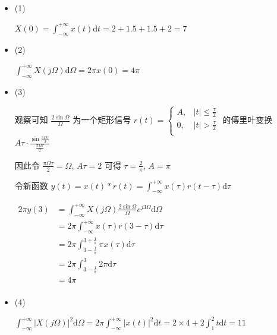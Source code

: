 \documentclass[a4paper,UTF8]{article}
\numberwithin{equation}{section}
\begin{document}
\begin{framed}
\begin{spacing}{1.5}
    \begin{itemize}
      \item (1)

      $\displaystyle X(0) = \int_{-\infty}^{+\infty}x(t)\mathrm{d}t = 2 + 1.5 + 1.5 + 2 = 7$
      
      \item (2)
      
      $\displaystyle \int_{-\infty}^{+\infty}X(j\Omega)\mathrm{d}\Omega = 2\pi x(0) = 4\pi$
      
      \item (3)
      
      观察可知 $\displaystyle \frac{2\sin \Omega}{\Omega}$ 为一个矩形信号 $r(t) = \begin{cases}
          A, & |t| \le \frac{\tau}{2} \\
          0, & |t| > \frac{\tau}{2} \\
      \end{cases}$ 的傅里叶变换 $\displaystyle A\tau \cdot \frac{\sin \frac{\pi \Omega \tau}{2}}{\frac{\pi \Omega \tau}{2}}$
      
      因此令 $\displaystyle \frac{\pi \Omega\tau}{2} = \Omega$, $A\tau = 2$ 可得 $\displaystyle \tau = \frac{2}{\pi}$, $A = \pi$
      
      令新函数 $\displaystyle y(t) = x(t) * r(t) = \int_{-\infty}^{+\infty}x(\tau)r(t-\tau)\mathrm{d}\tau$
      
      $
      \begin{aligned}
      \displaystyle 2\pi y(3) & = \int_{-\infty}^{+\infty}X(j\Omega)\frac{2\sin \Omega}{\Omega}e^{j 3\Omega}\mathrm{d}\Omega  \\
      & = 2\pi \int_{-\infty}^{+\infty}x(\tau)r(3-\tau)\mathrm{d}\tau  \\
      & = 2\pi \int_{3-\frac{1}{\pi}}^{3+\frac{1}{\pi}}\pi x(\tau)\mathrm{d}\tau  \\
      & = 2\pi \int_{3-\frac{1}{\pi}}^{3}2\pi\mathrm{d}\tau  \\
      & = 4 \pi  \\
      \end{aligned}
      $
      
      \item (4)
      
      $\displaystyle \int_{-\infty}^{+\infty}|X(j\Omega)|^{2}\mathrm{d}\Omega = 2\pi \int_{-\infty}^{+\infty}|x(t)|^{2}\mathrm{d}t = 2 \times 4 + 2\int_{1}^{2}t \mathrm{d}t = 11$
    \end{itemize}
\end{spacing}
\end{framed}
\end{document}
